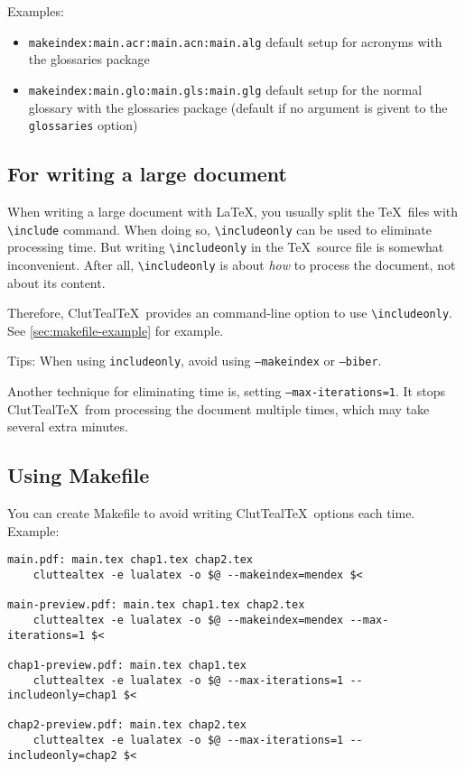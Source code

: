 \documentclass[a4paper, 11pt]{scrartcl}
\newcommand\CluttealTeX{ClutTeal\TeX\xspace}
\newcommand\texcmd[1]{\texttt{\textbackslash #1}}
\begin{document}
Examples:
\begin{itemize}
	\item  \texttt{makeindex:main.acr:main.acn:main.alg}
		\newline
		default setup for
		acronyms with the glossaries package
	\item \texttt{makeindex:main.glo:main.gls:main.glg}
		\newline
		default setup for the
		normal glossary with the glossaries package
		\newline
		(default if no argument is givent to the \texttt{glossaries} option)
\end{itemize}

\subsection{For writing a large document}
When writing a large document with \LaTeX, you usually split the \TeX\ files with \texcmd{include} command.
When doing so, \texcmd{includeonly} can be used to eliminate processing time.
But writing \texcmd{includeonly} in the \TeX\ source file is somewhat inconvenient.
After all, \texcmd{includeonly} is about \emph{how} to process the document, not about its content.

Therefore, \CluttealTeX\ provides an command-line option to use \texcmd{includeonly}.
See \autoref{sec:makefile-example} for example.

Tips: When using \texttt{includeonly}, avoid using \texttt{--makeindex} or \texttt{--biber}.

Another technique for eliminating time is, setting \texttt{--max-iterations=1}.
It stops \CluttealTeX\ from processing the document multiple times, which may take several extra minutes.

\subsection{Using Makefile}\label{sec:makefile-example}
You can create Makefile to avoid writing \CluttealTeX\ options each time.
Example:
\begin{verbatim}
main.pdf: main.tex chap1.tex chap2.tex
    cluttealtex -e lualatex -o $@ --makeindex=mendex $<

main-preview.pdf: main.tex chap1.tex chap2.tex
    cluttealtex -e lualatex -o $@ --makeindex=mendex --max-iterations=1 $<

chap1-preview.pdf: main.tex chap1.tex
    cluttealtex -e lualatex -o $@ --max-iterations=1 --includeonly=chap1 $<

chap2-preview.pdf: main.tex chap2.tex
    cluttealtex -e lualatex -o $@ --max-iterations=1 --includeonly=chap2 $<
\end{verbatim}
\end{document}
